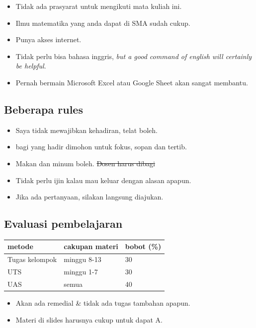 \documentclass[
  letterpaper,
  DIV=11,
  numbers=noendperiod]{scrartcl}
\providecommand{\tightlist}{%
  \setlength{\itemsep}{0pt}\setlength{\parskip}{0pt}}\usepackage{longtable,booktabs,array}
\begin{document}
\begin{itemize}
\tightlist
\item
  Tidak ada prasyarat untuk mengikuti mata kuliah ini.
\item
  Ilmu matematika yang anda dapat di SMA sudah cukup.
\item
  Punya akses internet.
\item
  Tidak perlu bisa bahasa inggris, \emph{but a good command of english
  will certainly be helpful}.
\item
  Pernah bermain Microsoft Excel atau Google Sheet akan sangat membantu.
\end{itemize}

\subsection{Beberapa rules}\label{beberapa-rules}

\begin{itemize}
\tightlist
\item
  Saya tidak mewajibkan kehadiran, telat boleh.
\item
  bagi yang hadir dimohon untuk fokus, sopan dan tertib.
\item
  Makan dan minum boleh. \st{Dosen harus dibagi}
\item
  Tidak perlu ijin kalau mau keluar dengan alasan apapun.
\item
  Jika ada pertanyaan, silakan langsung diajukan.
\end{itemize}

\subsection{Evaluasi pembelajaran}\label{evaluasi-pembelajaran}

\begin{longtable}[]{@{}lll@{}}
\toprule\noalign{}
metode & cakupan materi & bobot (\%) \\
\midrule\noalign{}
\endhead
\bottomrule\noalign{}
\endlastfoot
Tugas kelompok & minggu 8-13 & 30 \\
UTS & minggu 1-7 & 30 \\
UAS & semua & 40 \\
\end{longtable}

\begin{itemize}
\tightlist
\item
  Akan ada remedial \& tidak ada tugas tambahan apapun.
\item
  Materi di slides harusnya cukup untuk dapat A.
\end{itemize}
\end{document}
